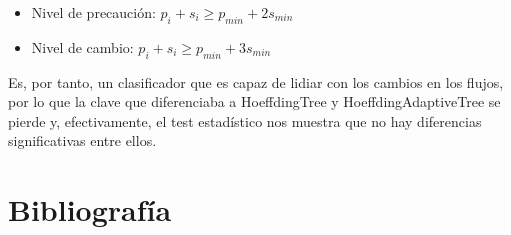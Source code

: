 \begin{itemize}
	\item Nivel de precaución: $p_i + s_i \geq p_{min} + 2 s_{min}$
	\item Nivel de cambio: $p_i + s_i \geq p_{min} + 3 s_{min}$
\end{itemize} 

Es, por tanto, un clasificador que es capaz de lidiar con los cambios en los flujos, por lo que la clave que diferenciaba a HoeffdingTree y HoeffdingAdaptiveTree se pierde y, efectivamente, el test estadístico nos muestra que no hay diferencias significativas entre ellos. 
\newpage
\section{Bibliografía}




